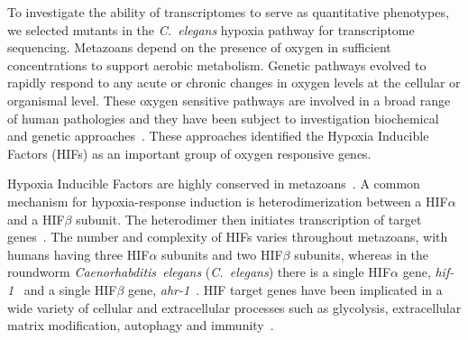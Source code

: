 \documentclass[9pt,twocolumn,twoside]{pnas-new}
\newcommand{\cel}{\emph{C.~elegans}}
\newcommand{\hif}{\emph{hif-1}}
\begin{document}
To investigate the ability of transcriptomes to serve as quantitative phenotypes,
we selected mutants in the \cel{} hypoxia pathway for transcriptome sequencing.
Metazoans depend on the presence of oxygen in sufficient concentrations to
support aerobic metabolism. Genetic pathways evolved to rapidly respond to any
acute or chronic changes in oxygen levels at the cellular or organismal level.
These oxygen sensitive pathways are involved in a broad range of human
pathologies and they have been subject to investigation biochemical and
genetic approaches~\cite{Semenza2012}. These approaches identified the Hypoxia
Inducible Factors (HIFs) as an important group of oxygen responsive genes.

Hypoxia Inducible Factors are highly conserved in metazoans~\cite{Loenarz2011}.
A common mechanism for hypoxia-response induction is heterodimerization between a
HIF$\alpha$ and a HIF$\beta$ subunit. The heterodimer then initiates
transcription of target genes~\cite{Jiang1996}. The number and complexity of HIFs varies
throughout metazoans, with humans having three HIF$\alpha$ subunits and two
HIF$\beta$ subunits, whereas in the roundworm \emph{Caenorhabditis~elegans}
(\cel{}) there is a single HIF$\alpha$ gene, \hif{}~\cite{Jiang2001} and a single HIF$\beta$
gene, \emph{ahr-1}~\cite{Powell-Coffman1998}. HIF target genes have been implicated
in a wide variety of cellular and extracellular processes such as glycolysis,
extracellular matrix modification, autophagy and immunity~\cite{Semenza1994,
Bishop2004,Shen2005,Bellier2009,Semenza2012}.
\end{document}
